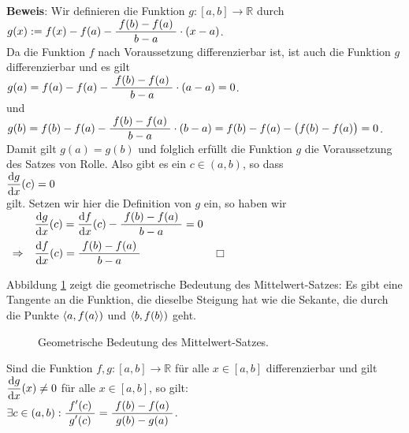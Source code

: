 \noindent
\textbf{Beweis}: Wir definieren die Funktion $g:[a,b] \rightarrow \mathbb{R}$ durch
\\[0.3cm]
\hspace*{1.3cm} $g(x) := f(x) - f(a) - \displaystyle\frac{\;\displaystyle f(b) - f(a)\;}{\;\displaystyle b-a\;}\cdot (x-a)$.
\\[0.3cm]
Da die Funktion $f$ nach Voraussetzung differenzierbar ist, ist auch die Funktion $g$ differenzierbar und es gilt 
\\[0.3cm]
\hspace*{1.3cm}
$g(a) = f(a) - f(a) - \displaystyle\frac{\;\displaystyle f(b) - f(a)\;}{\;\displaystyle b-a\;}\cdot (a-a) =0$.
\\[0.0cm]
und
\\[0.0cm]
\hspace*{1.3cm} $g(b) = f(b) - f(a) - \displaystyle\frac{\;\displaystyle f(b) - f(a)\;}{\;\displaystyle b-a\;}\cdot (b-a) = f(b) - f(a) - \bigl(f(b) - f(a)\bigr) = 0$.
\\[0.3cm]
Damit gilt $g(a) = g(b)$ und folglich erf\"ullt die Funktion $g$ die Voraussetzung des Satzes von Rolle.  Also gibt es ein
$c \in (a,b)$, so dass 
\\[0.3cm]
\hspace*{1.3cm}
$\displaystyle\frac{\textrm{d}g}{\textrm{d}x}(c) = 0$
\\[0.3cm]
gilt.  Setzen wir hier die Definition von $g$ ein, so haben wir 
\\[0.3cm]
\hspace*{1.3cm}
$
\begin{array}[b]{ll}
            & \displaystyle\frac{\textrm{d}g}{\textrm{d}x}(c) = \displaystyle\frac{\textrm{d}f}{\textrm{d}x}(c) - \displaystyle\frac{\;\displaystyle f(b) - f(a)\;}{\;\displaystyle b-a\;} = 0 \\[0.3cm]
\Rightarrow & \displaystyle\frac{\textrm{d}f}{\textrm{d}x}(c) = \displaystyle\frac{\;\displaystyle f(b) - f(a)\;}{\;\displaystyle b-a\;}
\end{array}
$
\hspace*{\fill} $\Box$
\vspace*{0.3cm}

Abbildung \ref{fig:mean-value-theorem} zeigt die geometrische Bedeutung des
Mittelwert-Satzes:  Es gibt eine Tangente an die Funktion, die dieselbe Steigung hat wie
die Sekante, die durch die Punkte $\pair(a,f(a))$ und $\pair(b,f(b))$  geht.
      \begin{figure}[!h]
        \centering
        \caption{Geometrische Bedeutung des Mittelwert-Satzes.}
        \label{fig:mean-value-theorem}
      \end{figure}


\begin{Satz}
  Sind die Funktion $f,g:[a,b] \rightarrow \mathbb{R}$ f\"ur alle $x\in[a,b]$
  differenzierbar und gilt $\displaystyle\frac{\textrm{d}g}{\textrm{d}x}(x) \not= 0$ f\"ur alle $x \in [a,b]$,
  so gilt: 
  \\[0.3cm]
  \hspace*{1.3cm}
  $\exists c \in (a,b): \displaystyle\frac{\;\displaystyle f'(c)\;}{\;\displaystyle g'(c)\;} = \displaystyle\frac{\;\displaystyle f(b) - f(a)\;}{\;\displaystyle g(b) - g(a)\;}$.
  \eox
\end{Satz}

